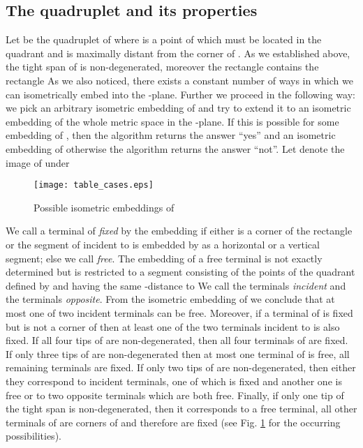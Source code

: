 \documentclass[11pt]{amsart}
\begin{document}
\subsection{The quadruplet  and its properties}\label{P} Let 
be the quadruplet of  where  is a point of  which must
be located in the quadrant  and is maximally distant
from the corner  of . As we established
above, the tight span of  is non-degenerated,  moreover the
rectangle  contains the rectangle  As we also
noticed, there exists a constant number of ways in which we can
isometrically embed   into the -plane. Further we proceed
in the following way: we pick an arbitrary isometric embedding
 of  and try to extend it to an isometric embedding
 of the whole metric space  in the -plane. If
this is possible for some embedding of , then the algorithm
returns the answer ``yes'' and an isometric embedding of 
otherwise the algorithm returns the answer ``not''. Let  denote
the image of  under 

\begin{figure}
\begin{center}
\texttt{[image: table\_cases.eps]}
\end{center}
\caption{Possible isometric embeddings of }
\label{TP*}
\end{figure}





We call a terminal  of  {\it fixed} by the embedding  if either 
is a corner of the rectangle  or the segment of  incident to  is embedded by
 as a horizontal or a vertical segment; else we call  {\it free}.
The embedding of a free terminal  is not exactly determined but is restricted
to a segment  consisting  of the points of the quadrant defined by 
and having the same -distance to  We call the terminals
  {\it incident} and
the terminals  {\it opposite}.
From the isometric embedding of  we conclude that at most one of
two incident terminals can be free. Moreover, if a terminal  of  is
fixed but is not a corner of  then at least one of the two terminals
incident to  is also fixed. If all four tips of  are non-degenerated,
then all four terminals of  are fixed. If only three tips of  are
non-degenerated then at most one terminal of  is free, all remaining
terminals are fixed. If only two tips of  are non-degenerated,
then either they correspond to incident terminals, one of which is
fixed and another one is free or to two opposite terminals which are both free.
Finally, if only one tip of the tight span is non-degenerated, then it corresponds
to a free terminal, all other terminals of  are corners of  and therefore
are fixed (see Fig. \ref{TP*} for the occurring  possibilities).
\end{document}
